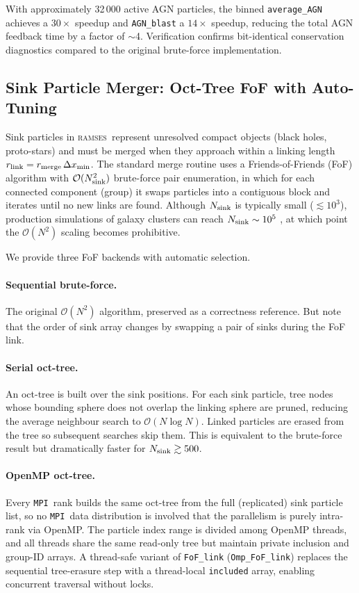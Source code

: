 \documentclass[fleqn,usenatbib]{mnras}
\newcommand{\ramses}{\textsc{ramses}}
\newcommand{\Olog}[1]{\mathcal{O}(#1)}
\newcommand{\code}[1]{\texttt{#1}}
\newcommand{\mpi}[0]{\texttt{MPI}}
\begin{document}
With approximately 32\,000 active AGN particles, the binned
\code{average\_AGN} achieves a $30\times$ speedup and \code{AGN\_blast}
a $14\times$ speedup, reducing the total AGN feedback time by a factor
of $\sim$4. Verification confirms bit-identical conservation
diagnostics compared to the original brute-force implementation.


\subsection{Sink Particle Merger: Oct-Tree FoF with Auto-Tuning}
\label{sec:fof}

Sink particles in \ramses\ represent unresolved compact objects (black
holes, proto-stars) and must be merged when they approach within a
linking length $r_{\rm link} = r_{\rm merge}\,\Delta x_{\rm min}$.
The standard merge routine uses a Friends-of-Friends (FoF) algorithm
with $\Olog{N_{\rm sink}^2}$ brute-force pair enumeration, in which for each
connected component (group) it swaps particles into a contiguous block
and iterates until no new links are found.  Although $N_{\rm sink}$ is
typically small (${\lesssim}10^3$), production simulations of galaxy
clusters can reach $N_{\rm sink} \sim 10^5$
\citep[e.g.\ Horizon Run~5;][]{Lee2021}, at which point the
$\Olog{N^2}$ scaling becomes prohibitive.

We provide three FoF backends with automatic selection.

\paragraph{Sequential brute-force.}
The original $\Olog{N^2}$ algorithm, preserved as a correctness
reference. But note that the order of sink array changes by swapping a pair of sinks during the FoF link.

\paragraph{Serial oct-tree.}
An oct-tree is built over the sink positions.  For each sink particle,
tree nodes whose bounding sphere does not overlap the linking sphere
are pruned, reducing the average neighbour search to
$\Olog{N\log N}$.  Linked particles are erased from the tree
so subsequent searches skip them.  This is
equivalent to the brute-force result but dramatically faster for
$N_{\rm sink} \gtrsim 500$.

\paragraph{OpenMP oct-tree.}
Every \mpi\ rank builds the same oct-tree from the full (replicated)
sink particle list, so no \mpi\ data distribution is involved that the
parallelism is purely intra-rank via OpenMP.  The particle index range
is divided among OpenMP threads, and all threads share the same
read-only tree but maintain private inclusion and group-ID arrays.
A thread-safe variant of \code{FoF\_link}
(\code{Omp\_FoF\_link}) replaces the sequential tree-erasure step
with a thread-local \code{included} array, enabling concurrent
traversal without locks.
\end{document}
